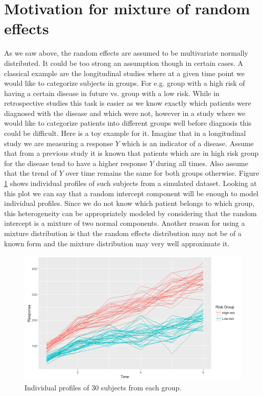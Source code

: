 \section{Motivation for mixture of random effects}
As we saw above, the random effects are assumed to be multivariate normally distributed. It could be too strong an assumption though in certain cases. A classical example are the longitudinal studies where at a given time point we would like to categorize subjects in groups. For e.g. group with a high risk of having a certain disease in future vs. group with a low risk. While in retrospective studies this task is easier as we know exactly which patients were diagnosed with the disease and which were not, however in a study where we would like to categorize patients into different groups well before diagnosis this could be difficult. Here is a toy example for it. Imagine that in a longitudinal study we are measuring a response $Y$ which is an indicator of a disease. Assume that from a previous study it is known that patients which are in high risk group for the disease tend to have a higher response $Y$ during all times. Also assume that the trend of $Y$ over time remains the same for both groups otherwise. Figure \ref{fig : random_slope_dummy_data} shows individual profiles of such subjects from a simulated dataset. Looking at this plot we can say that a random intercept component will be enough to model individual profiles. Since we do not know which patient belongs to which group, this heterogeneity can be appropriately modeled by considering that the random intercept is a mixture of two normal components. Another reason for using a mixture distribution is that the random effects distribution may not be of a known form and the mixture distribution may very well approximate it.\\

\begin{figure}
	\centering
	\captionsetup{justification=centering}
	\includegraphics[scale=0.5]{mainmatter/chapter_3_blmm/random_slope_dummy_data.png}
	\caption{Individual profiles of 30 subjects from each group.}
	\label{fig : random_slope_dummy_data}
\end{figure}


